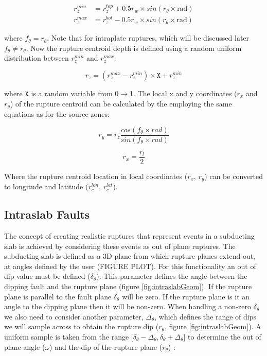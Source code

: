 \begin{subequations} \label{drange}
\begin{align}
r_z^{min} & = r_z^{top} + 0.5r_w  \times sin(r_\theta  \times \mbox{rad})    \\
r_z^{max} & = r_z^{bot} - 0.5r_w  \times sin(r_\theta \times \mbox{rad})  
\end{align}
\end{subequations}

where $f_\theta = r_\theta$. Note that for intraplate ruptures, which will be discussed later $f_\theta \ne r_\theta$. 
Now the rupture centroid depth is defined using a random uniform distribution between $r_z^{min}$ and $r_z^{max}$:

\begin{equation} \label{eq:rand}
	r_z = ( r_z^{max}-r_z^{min} ) \times  \mathtt{X} +   r_z^{min}
\end{equation}

where $\mathtt{X}$ is a random variable from 0$\rightarrow$1. The local x and y coordinates ($r_x$ and $r_y$) of the rupture 
centroid can be calculated by the employing the same equations as for the source zones:

\begin{equation}
r_y = r_z  \frac{cos(f_\theta  \times rad)}{sin(f_\theta  \times rad)}
\end{equation}

\begin{equation}
r_x = \frac{r_l}{2}
\end{equation}

Where the rupture centroid location in local coordinates ($r_x$, $r_y$) can be converted to longitude and latitude ($r_c^{lon}$, $r_c^{lat}$).

\subsection{Intraslab Faults}

The concept of creating realistic ruptures that represent events in a subducting slab is achieved by considering these events as 
out of plane ruptures. The subducting slab is defined as a 3D plane from which rupture planes extend out, at angles defined by
the user (FIGURE PLOT). For this functionality an out of dip value must be defined ($\delta_\theta$). 
This parameter defines the angle between the dipping fault and the rupture plane (figure \ref{fig:intraslabGeom}). If the rupture 
plane is parallel to the fault plane $\delta_\theta$ will be zero. If the rupture plane is it an angle to the dipping plane then it 
will be non-zero. When handling a non-zero $\delta_\theta$ we also need to consider another parameter, $\Delta_\theta$, which 
defines the range of dips we will sample across to obtain the rupture dip ($r_\theta$, figure \ref{fig:intraslabGeom}).
A uniform sample is taken from the range [$\delta_\theta - \Delta_\theta, \delta_\theta + \Delta_\theta$] to determine 
the out of plane angle ($\omega$) and the dip of the rupture plane ($r_\theta$) :


